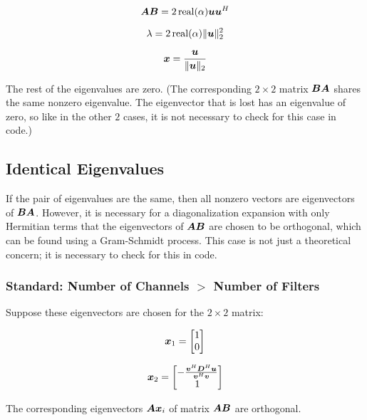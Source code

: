\documentclass{article}
\begin{document}
\begin{equation}
\bm{A}\bm{B} = 2\operatorname{real}(\alpha)\bm{u}\bm{u}^H
\end{equation}

\begin{equation}
\lambda = 2\operatorname{real}(\alpha) \|\bm{u}\|_2^2
\end{equation}

\begin{equation}
\bm{x} = \frac{\bm{u}}{\|\bm{u}\|_2}
\end{equation}

The rest of the eigenvalues are zero.  (The corresponding $2 \times 2$ matrix $\bm{B}\bm{A}$ shares the same nonzero eigenvalue. The eigenvector that is lost has an eigenvalue of zero, so like in the other $2$ cases, it is not necessary to check for this case in code.)

\subsection{Identical Eigenvalues}

If the pair of eigenvalues are the same, then all nonzero vectors are eigenvectors of $\bm{B}\bm{A}$. However, it is necessary for a diagonalization expansion with only Hermitian terms that the eigenvectors of $\bm{A}\bm{B}$ are chosen to be orthogonal, which can be found using a Gram-Schmidt process. This case is not just a theoretical concern; it is necessary to check for this in code.

\subsubsection{Standard: Number of Channels $>$ Number of Filters}

Suppose these eigenvectors are chosen for the $2 \times 2$ matrix:

\begin{equation}
\bm{x}_1 = \begin{bmatrix}
1 \\
0
\end{bmatrix}
\end{equation}

\begin{equation}
\bm{x}_2 = \begin{bmatrix}
-\frac{\bm{v}^H\bm{D}^H\bm{u}}{\bm{v}^H\bm{v}} \\
1
\end{bmatrix}
\end{equation}

The corresponding eigenvectors $\bm{A}\bm{x}_i$ of matrix $\bm{A}\bm{B}$ are orthogonal.
\end{document}
